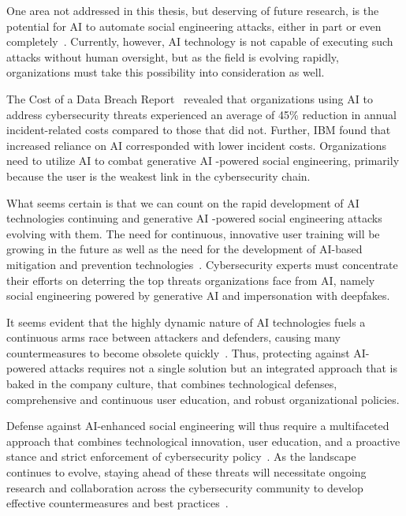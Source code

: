 One area not addressed in this thesis, but deserving of future research, is the potential for AI to automate social engineering attacks, either in part or even completely~\citep{mirsky_Threat_Offensive_AI_Organizations_2023}. Currently, however, AI technology is not capable of executing such attacks without human oversight, but as the field is evolving rapidly, organizations must take this possibility into consideration as well.


The Cost of a Data Breach Report~\citep{ibm_Cost_Data_Breach_Report_2024} revealed that organizations using AI to address cybersecurity threats experienced an average of 45\% reduction in annual incident-related costs compared to those that did not. Further, IBM found that increased reliance on AI corresponded with lower incident costs. Organizations need to utilize AI to combat generative AI -powered social engineering, primarily because the user is the weakest link in the cybersecurity chain.

What seems certain is that we can count on the rapid development of AI technologies continuing and generative AI -powered social engineering attacks evolving with them. The need for continuous, innovative user training will be growing in the future as well as the need for the development of AI-based mitigation and prevention technologies~\citep{mirsky_Threat_Offensive_AI_Organizations_2023}. Cybersecurity experts must concentrate their efforts on deterring the top threats organizations face from AI, namely social engineering powered by generative AI and impersonation with deepfakes.

It seems evident that the highly dynamic nature of AI technologies fuels a continuous arms race between attackers and defenders, causing many countermeasures to become obsolete quickly~\citep{fakhouri_AI_Driven_Solutions_SE_Attacks_2024}. Thus, protecting against AI-powered attacks requires not a single solution but an integrated approach that is baked in the company culture, that combines technological defenses, comprehensive and continuous user education, and robust organizational policies.

%
%
Defense against AI-enhanced social engineering will thus require a multifaceted approach that combines technological innovation, user education, and a proactive stance and strict enforcement of cybersecurity policy~\citep{blauth_AI_Crime_Overview_Malicious_Use_Abuse_2022}. As the landscape continues to evolve, staying ahead of these threats will necessitate ongoing research and collaboration across the cybersecurity community to develop effective countermeasures and best practices~\citep{fakhouri_AI_Driven_Solutions_SE_Attacks_2024}.
